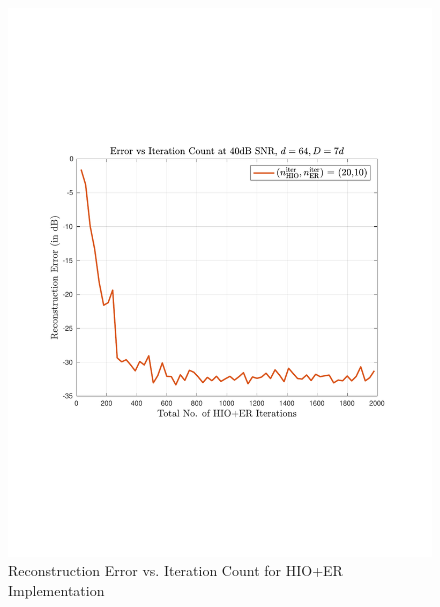\begin{figure}[H]
  \centering
  \includegraphics[clip=true, trim = 0.75in 2.75in 1in 2.75in,scale=0.45]{pics/err_iteration_count}
  \caption{Reconstruction Error vs. Iteration Count for HIO+ER Implementation}
  \label{fig:iter_HIOER}
\end{figure}



